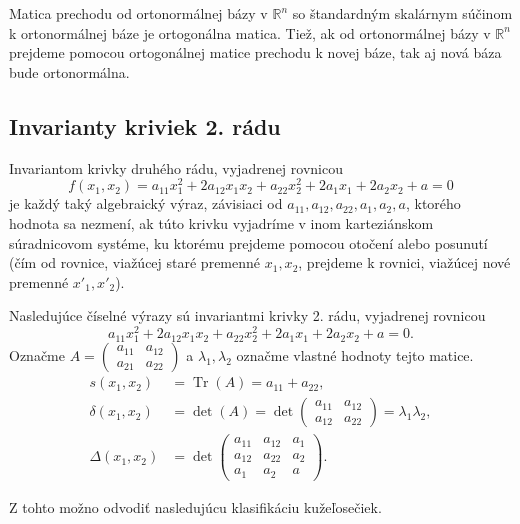 \begin{theorem} 
Matica prechodu od ortonormálnej bázy v $\mathbb{R}^n$ so štandardným skalárnym súčinom k ortonormálnej báze je ortogonálna matica. Tiež, ak od ortonormálnej bázy v $\mathbb{R}^n$ prejdeme pomocou ortogonálnej matice prechodu k novej báze,
tak aj nová báza bude ortonormálna.
\end{theorem}

\subsection{Invarianty kriviek 2. rádu}
\begin{definition}
Invariantom krivky druhého rádu, vyjadrenej rovnicou
$$
f(x_1, x_2) = a_{11}x_1^2 + 2a_{12}x_1x_2 + a_{22}x_2^2 + 2a_1x_1 + 2a_2x_2 + a = 0
$$
je každý taký algebraický výraz, závisiaci od \(a_{11}, a_{12}, a_{22}, a_1, a_2, a\), ktorého hodnota sa nezmení, ak túto krivku vyjadríme v inom karteziánskom súradnicovom
systéme, ku ktorému prejdeme pomocou otočení alebo posunutí (čím od rovnice,
viažúcej staré premenné \(x_1, x_2\), prejdeme k rovnici, viažúcej nové premenné
\(x'_{1}, x'_{2}\)).
\end{definition}

\begin{theorem}
Nasledujúce číselné výrazy sú invariantmi krivky 2. rádu, vyjadrenej rovnicou
\[ a_{11}x_1^2 + 2a_{12}x_1x_2 + a_{22}x_2^2 + 2a_1x_1 + 2a_2x_2 + a = 0. \]
Označme
\(A = \begin{pmatrix} a_{11} & a_{12} \\ a_{21} & a_{22} \end{pmatrix}\)
 a \(\lambda_1, \lambda_2\) označme vlastné hodnoty tejto matice.
\begin{align*}
s(x_1,x_2) &= \operatorname{Tr}(A) = a_{11} + a_{22}, \\
\delta(x_1,x_2) &= \det(A) = \det \begin{pmatrix} a_{11} & a_{12} \\ a_{12} & a_{22} \end{pmatrix} = \lambda_1 \lambda_2, \\
\Delta(x_1,x_2) &= \det \begin{pmatrix} a_{11} & a_{12} & a_1 \\ a_{12} & a_{22} & a_2 \\ a_1 & a_2 & a \end{pmatrix}.
\end{align*}
\end{theorem}
Z tohto možno odvodiť nasledujúcu klasifikáciu kužeľosečiek.

